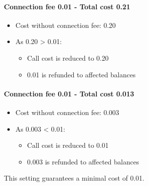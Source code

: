 \documentclass[letterpaper,10pt,english]{sphinxmanual}
\begin{document}
\paragraph{Connection fee 0.01 - Total cost 0.21}
\begin{itemize}
\item {} 
Cost without connection fee: 0.20

\item {} 
As 0.20 \textgreater{} 0.01:
\begin{itemize}
\item {} 
Call cost is reduced to 0.20

\item {} 
0.01 is refunded to affected balances

\end{itemize}

\end{itemize}
\paragraph{Connection fee 0.01 - Total cost 0.013}
\begin{itemize}
\item {} 
Cost without connection fee: 0.003

\item {} 
As 0.003 \textless{} 0.01:
\begin{itemize}
\item {} 
Call cost is reduced to 0.01

\item {} 
0.003 is refunded to affected balances

\end{itemize}

\end{itemize}

This setting guarantees a minimal cost of 0.01.
\end{document}
